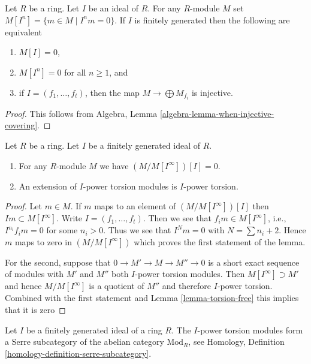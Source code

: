 \begin{lemma}
\label{lemma-torsion-free}
Let $R$ be a ring. Let $I$ be an ideal of $R$.
For any $R$-module $M$ set $M[I^n] = \{m \in M \mid I^nm = 0\}$.
If $I$ is finitely generated then the following are equivalent
\begin{enumerate}
\item $M[I] = 0$,
\item $M[I^n] = 0$ for all $n \geq 1$, and
\item if $I = (f_1, \ldots, f_t)$, then the map
$M \to \bigoplus M_{f_i}$ is injective.
\end{enumerate}
\end{lemma}

\begin{proof}
This follows from
Algebra, Lemma \ref{algebra-lemma-when-injective-covering}.
\end{proof}

\begin{lemma}
\label{lemma-divide-by-torsion}
Let $R$ be a ring. Let $I$ be a finitely generated ideal of $R$.
\begin{enumerate}
\item For any $R$-module $M$ we have $(M/M[I^\infty])[I] = 0$.
\item An extension of $I$-power torsion modules is $I$-power torsion.
\end{enumerate}
\end{lemma}

\begin{proof}
Let $m \in M$. If $m$ maps to an element of $(M/M[I^\infty])[I]$
then $Im \subset M[I^\infty]$.
Write $I = (f_1, \ldots, f_t)$. Then we see that
$f_i m \in M[I^\infty]$, i.e., $I^{n_i}f_i m = 0$ for some $n_i > 0$.
Thus we see that $I^Nm = 0$ with $N = \sum n_i + 2$.
Hence $m$ maps to zero in $(M/M[I^\infty])$ which proves the
first statement of the lemma.

\medskip\noindent
For the second, suppose that $0 \to M' \to M \to M'' \to 0$ is a short
exact sequence of modules with $M'$ and $M''$ both $I$-power torsion
modules. Then $M[I^\infty] \supset M'$ and hence $M/M[I^\infty]$ is a
quotient of $M''$ and therefore $I$-power torsion. Combined with
the first statement and Lemma \ref{lemma-torsion-free} this implies
that it is zero
\end{proof}

\begin{lemma}
\label{lemma-I-power-torsion}
Let $I$ be a finitely generated ideal of a ring $R$.
The $I$-power torsion modules form a Serre subcategory of
the abelian category $\text{Mod}_R$, see
Homology, Definition \ref{homology-definition-serre-subcategory}.
\end{lemma}

